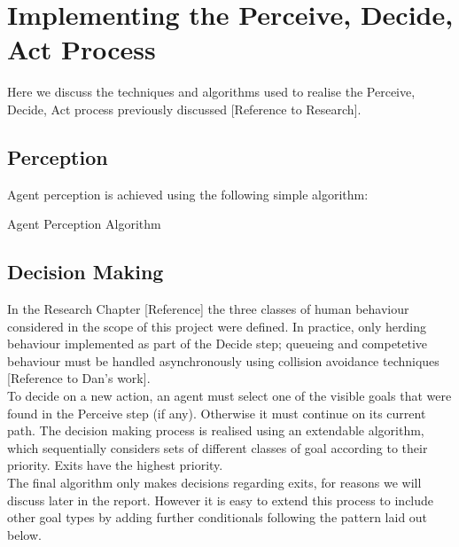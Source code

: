 \section{Implementing the Perceive, Decide, Act Process}
Here we discuss the techniques and algorithms used to realise the Perceive, Decide, Act process previously discussed [Reference to Research].

\subsection{Perception}
Agent perception is achieved using the following simple algorithm:

\begin{algorithm}[H] %
 \SetAlgoLined
 \BlankLine
  \caption{Agent Perception Algorithm}
\end{algorithm}

\subsection{Decision Making}
In the Research Chapter [Reference] the three classes of human behaviour considered in the scope of this project were defined. In practice, only herding behaviour implemented as part of the Decide step; queueing and competetive behaviour must be handled asynchronously using collision avoidance techniques [Reference to Dan's work].\\
To decide on a new action, an agent must select one of the visible goals that were found in the Perceive step (if any). Otherwise it must continue on its current path. The decision making process is realised using an extendable algorithm, which sequentially considers sets of different classes of goal according to their priority. Exits have the highest priority.\\

The final algorithm only makes decisions regarding exits, for reasons we will discuss later in the report. However it is easy to extend this process to include other goal types by adding further conditionals following the pattern laid out below.\\

